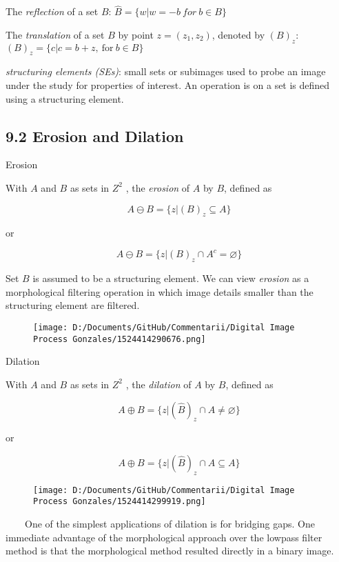 \documentclass[]{article}
\begin{document}
The \emph{reflection} of a set \(B\):
\(\hat{B}=\{w|w=-b\ for\ b\in B\}\)

The \emph{translation} of a set \(B\) by point \(z=(z_1,z_2)\), denoted
by \((B)_z\): \((B)_z=\{c|c=b+z,\ \text{for}\ b\in B\}\)

\emph{structuring elements (SEs)}: small sets or subimages used to probe
an image under the study for properties of interest. An operation is on
a set is defined using a structuring element.

\subsection{9.2 Erosion and Dilation}\label{header-n136}

Erosion

With \(A\) and \(B\) as sets in \(Z^2\) , the \emph{erosion} of \(A\) by
\(B\), defined as

\[A\ominus B=\{z|(B)_z\subseteq A\}\]

or

\[A\ominus B=\{z|(B)_z\cap A^c=\varnothing \}\]

Set \(B\) is assumed to be a structuring element. We can view
\emph{erosion} as a morphological filtering operation in which image
details smaller than the structuring element are filtered.

\begin{figure}
\centering
\texttt{[image: D:/Documents/GitHub/Commentarii/Digital Image Process Gonzales/1524414290676.png]}
\caption{}
\end{figure}

Dilation

With \(A\) and \(B\) as sets in \(Z^2\) , the \emph{dilation} of \(A\)
by \(B\), defined as

\[A\oplus B=\{z|(\hat{B})_z\cap A\neq\varnothing\}\]

or

\[A\oplus B=\{z|(\hat{B})_z\cap A\subseteq A \}\]

\begin{figure}
\centering
\texttt{[image: D:/Documents/GitHub/Commentarii/Digital Image Process Gonzales/1524414299919.png]}
\caption{}
\end{figure}

\(\quad\quad\)One of the simplest applications of dilation is for
bridging gaps. One immediate advantage of the morphological approach
over the lowpass filter method is that the morphological method resulted
directly in a binary image.
\end{document}
